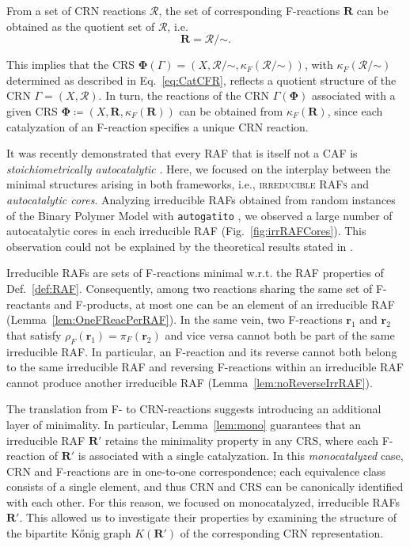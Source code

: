 \documentclass[pdflatex]{sn-jnl}
\theoremstyle{thmstyleone}%
\theoremstyle{examplesty}%
\theoremstyle{thmstylethree}%
\newcommand{\king}{K}
\newcommand{\CR}[0]{\mathcal{R}}
\newcommand{\FR}[0]{\mathbf{R}}
\newcommand{\fr}[0]{\mathbf{r}}
\newcommand{\RAF}[0]{\mathbf{R}'}
\newcommand{\feducts}{\rho_F}
\newcommand{\fproducts}{\pi_F}
\begin{document}
From a set of CRN reactions $\CR$, the set of corresponding F-reactions
$\FR$ can be obtained as the quotient set of $\CR$, i.e.
\begin{equation}
  \FR=\CR/\mathord{\sim}.
\end{equation} 

This implies that the CRS $\mathbf{\Phi}(\Gamma)= (X, \CR/\mathord{\sim},
\kappa_F(\CR/\mathord{\sim}))$, with $\kappa_F(\CR/\mathord{\sim})$
determined as described in Eq.~\eqref{eq:CatCFR}, reflects a quotient
structure of the CRN $\Gamma=(X, \CR)$. In turn, the reactions of the CRN
$\Gamma(\mathbf{\Phi})$ associated with a given CRS 
$\mathbf{\Phi}\coloneqq (X, \FR, \kappa_F(\FR))$ can be obtained from
$\kappa_F(\FR)$, since each catalyzation of an F-reaction specifies a
unique CRN reaction. 


It was recently demonstrated that every \textsc{RAF} that is itself not a \textsc{CAF} 
is \emph{stoichiometrically autocatalytic} \cite{golnik_bridging_2026}. Here,
we focused on the interplay between the minimal structures arising in both frameworks,
i.e., \textsc{irreducible RAFs} and \emph{autocatalytic cores}. Analyzing 
irreducible RAFs obtained from random instances of the Binary Polymer Model
\cite{kauffman_autocatalytic_1986} with \texttt{autogatito} \cite{golnik_using_2026}, 
we observed a large number of autocatalytic cores in each 
irreducible RAF (Fig.~\ref{fig:irrRAFCores}). This observation could not 
be explained by the theoretical results stated in \cite{golnik_bridging_2026}.


Irreducible RAFs are sets of F-reactions minimal w.r.t. the RAF properties 
of Def.~\ref{def:RAF}. Consequently, among two reactions sharing the same set of 
F-reactants and F-products, at most one can be an element of an irreducible RAF 
(Lemma~\ref{lem:OneFReacPerRAF}). In the same vein, two F-reactions $\fr_1$ 
and $\fr_2$ that satisfy $\feducts(\fr_1)=\fproducts(\fr_2)$ and vice versa cannot  
both be part of the same irreducible RAF. In particular, an F-reaction and its reverse 
cannot both belong to the same irreducible RAF and reversing F-reactions within 
an irreducible RAF cannot produce another irreducible RAF (Lemma~\ref{lem:noReverseIrrRAF}).

The translation from F- to CRN-reactions suggests introducing 
an additional layer of minimality. In particular, Lemma~\ref{lem:mono} 
guarantees that an irreducible RAF $\RAF$ retains the minimality property in 
any CRS, where each F-reaction of $\RAF$ is associated with a single 
catalyzation. In this \emph{monocatalyzed} case, CRN and F-reactions 
are in one-to-one correspondence; each equivalence class consists of 
a single element, and thus CRN and CRS can be canonically identified 
with each other. For this reason, we focused on monocatalyzed, irreducible 
RAFs $\RAF$. This allowed us to investigate their properties by examining 
the structure of the bipartite K\H{o}nig graph $\king(\RAF)$ of the corresponding 
CRN representation.
\end{document}
